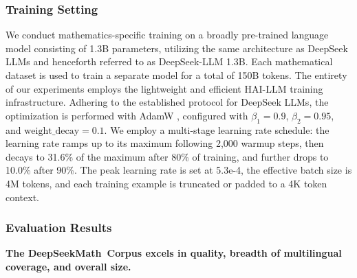 \subsubsection{Training Setting}
\label{sec:quality-policy}
We conduct mathematics-specific training on a broadly pre-trained language model consisting of 1.3B parameters, utilizing the same architecture as DeepSeek LLMs \citep{deepseek-llm} and henceforth referred to as DeepSeek-LLM 1.3B. Each mathematical dataset is used to train a separate model for a total of 150B tokens. The entirety of our experiments employs the lightweight and efficient HAI-LLM \citep{haillm} training infrastructure. Adhering to the established protocol for DeepSeek LLMs, the optimization is performed with AdamW \citep{adamW}, configured with $\beta_1=0.9$, $\beta_2=0.95$, and $\mathrm{weight\_decay}=0.1$. We employ a multi-stage learning rate schedule: the learning rate ramps up to its maximum following 2,000 warmup steps, then decays to 31.6\% of the maximum after 80\% of training, and further drops to 10.0\% after 90\%. The peak learning rate is set at 5.3e-4, the effective batch size is 4M tokens, and each training example is truncated or padded to a 4K token context.

\subsubsection{Evaluation Results}

\textbf{The DeepSeekMath~Corpus excels in quality, breadth of multilingual coverage, and overall size.}

